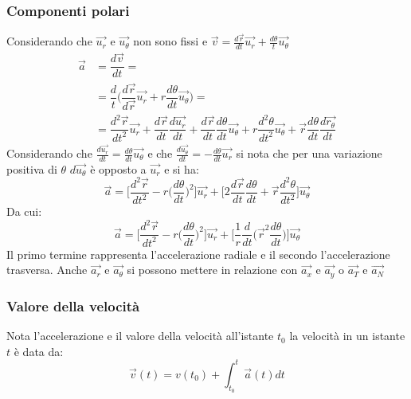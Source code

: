 \documentclass[class=book, crop=false, oneside, 12pt]{standalone}
\begin{document}
		\subsubsection{Componenti polari}
    Considerando che $\overrightarrow{u_r}$ e $\overrightarrow{u_\theta}$ non sono fissi e $\overrightarrow{v}=\frac{d\overrightarrow{r}}{dt}\overrightarrow{u_r}+\frac{d\theta}{t}\overrightarrow{u_\theta}$
		\begin{align*}
      \overrightarrow{a}&=\dfrac{d\overrightarrow{v}}{dt}=\\
                        &=\dfrac{d}{t}\biggl(\dfrac{d\overrightarrow{r}}{d\overrightarrow{r}}\overrightarrow{u_r}+r\dfrac{d\theta}{dt}\overrightarrow{u_\theta}\biggr)=\\
                        &=\dfrac{d^2\overrightarrow{r}}{dt^2}\overrightarrow{u_r}+\dfrac{d\overrightarrow{r}}{dt}\dfrac{d\overrightarrow{u_r}}{dt}+\dfrac{d\overrightarrow{r}}{dt}\dfrac{d\theta}{dt}\overrightarrow{u_\theta}+r\dfrac{d^2\theta}{dt^2}\overrightarrow{u_\theta}+\overrightarrow{r}\dfrac{d\theta}{dt}\dfrac{d\overrightarrow{r_\theta}}{dt}
		\end{align*}
    Considerando che $\frac{d\overrightarrow{u_r}}{dt}=\frac{d\theta}{dt}\overrightarrow{u_\theta}$ e che $\frac{d\overrightarrow{u_\theta}}{dt}=-\frac{d\theta}{dt}\overrightarrow{u_r}$ si nota che per una variazione positiva di $\theta$ $d\overrightarrow{u_\theta}$ \`e opposto a $\overrightarrow{u_r}$  e si ha:
    $$\overrightarrow{a}=\biggl[\dfrac{d^2\overrightarrow{r}}{dt^2}-r\biggl(\dfrac{d\theta}{dt}\biggr)^2\biggr]\overrightarrow{u_r}+\biggl[2\dfrac{d\overrightarrow{r}}{dt}\dfrac{d\theta}{dt}+\overrightarrow{r}\dfrac{d^2\theta}{dt^2}\biggr]\overrightarrow{u_\theta}$$
		Da cui:
    $$\overrightarrow{a}=\biggl[\dfrac{d^2\overrightarrow{r}}{dt^2}-r\biggl(\dfrac{d\theta}{dt}\biggr)^2\biggr]\overrightarrow{u_r}+\biggl[\dfrac{1}{r}\dfrac{d}{dt}\biggl(\overrightarrow{r}^2\dfrac{d\theta}{dt}\biggr)\biggr]\overrightarrow{u_\theta}$$
		Il primo termine rappresenta l'accelerazione radiale e il secondo l'accelerazione trasversa.
    Anche $\overrightarrow{a_r}$ e $\overrightarrow{a_\theta}$ si possono mettere in relazione con $\overrightarrow{a_x}$ e $\overrightarrow{a_y}$ o $\overrightarrow{a_T}$ e $\overrightarrow{a_N}$
		\subsubsection{Valore della velocit\`a}
		Nota l'accelerazione e il valore della velocit\`a all'istante $t_0$ la velocit\`a in un istante $t$ \`e data da:
    $$\overrightarrow{v}(t)=v(t_0)+\int_{t_0}^t\overrightarrow{a}(t)dt$$
\end{document}

